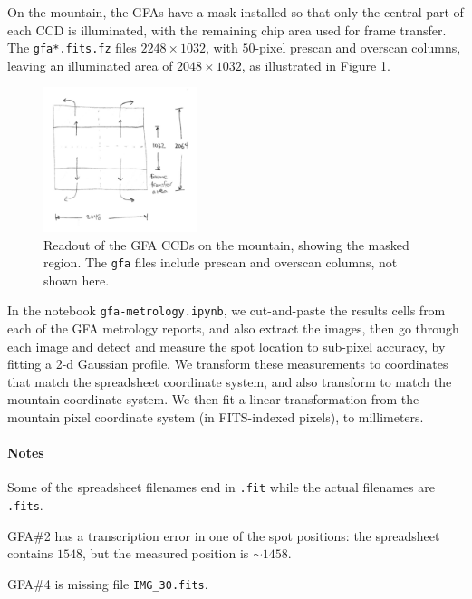 \documentclass[10pt]{article}
\newcommand{\code}[1]{\texttt{#1}}
\begin{document}
On the mountain, the GFAs have a mask installed so that only the
central part of each CCD is illuminated, with the remaining chip area
used for frame transfer.  The \code{gfa*.fits.fz} files $2248 \times
1032$, with $50$-pixel prescan and overscan columns, leaving an
illuminated area of $2048 \times 1032$, as illustrated in Figure
\ref{fig:mountain}.

\begin{figure}[h!]
  \begin{center}
    \includegraphics[width=0.4\textwidth]{gfa-metrology2.jpeg}
  \end{center}
  \caption{\label{fig:mountain}Readout of the GFA CCDs on the
    mountain, showing the masked region.  The \code{gfa} files include
    prescan and overscan columns, not shown here.}
\end{figure}

In the notebook \code{gfa-metrology.ipynb}, we cut-and-paste the
results cells from each of the GFA metrology reports, and also extract
the images, then go through each image and detect and measure the spot
location to sub-pixel accuracy, by fitting a 2-d Gaussian profile.  We
transform these measurements to coordinates that match the spreadsheet
coordinate system, and also transform to match the mountain coordinate
system.  We then fit a linear transformation from the mountain pixel
coordinate system (in FITS-indexed pixels), to millimeters.


\paragraph{Notes}

Some of the spreadsheet filenames end in \code{.fit} while the actual
filenames are \code{.fits}.

GFA\#2 has a transcription error in one of the spot positions: the
spreadsheet contains $1548$, but the measured position is $\sim 1458$.

GFA\#4 is missing file \code{IMG\_30.fits}.
\end{document}
